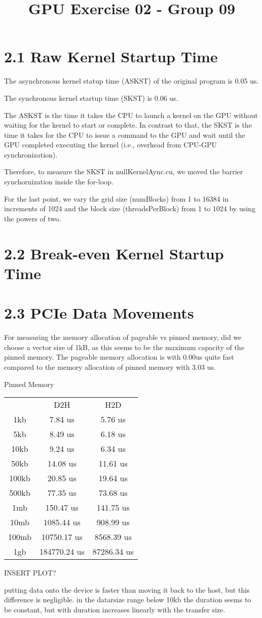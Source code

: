 \documentclass{report}
\begin{document}
\title{GPU Exercise 02 - Group 09}
\maketitle


\section*{2.1 Raw Kernel Startup Time}

The asynchronous kernel statup time (ASKST) of the original program is 0.05 us.

The synchronous kernel startup time (SKST) is 0.06 us.

The ASKST is the time it takes the CPU to launch a kernel on the GPU without waiting for the
kernel to start or complete. In contrast to that, the SKST is the time it takes for the CPU to issue a command to the GPU and wait until the GPU
completed executing the kernel (i.e., overhead from CPU-GPU synchronization).

Therefore, to measure the SKST in nullKernelAync.cu, we moved the barrier synchornization inside the for-loop.

For the last point, we vary the grid size (numBlocks) from 1 to 16384 in increments of 1024 and the block size (threadsPerBlock) from 1 to 1024 by using the powers of two.


\section*{2.2 Break-even Kernel Startup Time}


\section*{2.3 PCIe Data Movements}
For measuring the memory allocation of pageable vs pinned memory, did we choose a vector size of 1kB, as this seems to be the maximum capacity of the pinned memory.
The pageable memory allocation is with 0.00us quite fast compared to the memory allocation of pinned memory with 3.03 us.



Pinned Memory
\begin{center}
    \begin{tabular}{ c c c }
        & D2H & H2D \\ 
     1kb & 7.84 us & 5.76 us \\ 
     5kb & 8.49 us & 6.18 us \\  
     10kb &  9.24  us & 6.34 us \\ 
     50kb & 14.08 us & 11.61 us \\  
     100kb &  20.85   us & 19.64 us \\ 
     500kb & 77.35  us &  73.68 us \\    
     1mb &150.47 us & 141.75 us \\ 
     10mb & 1085.44 us &  908.99 us \\ 
     100mb &  10750.17   us & 8568.39 us \\ 
     1gb & 184770.24 us &  87286.34 us \\ 
    \end{tabular}
    \end{center}

    INSERT PLOT?

    putting data onto the device is faster than moving it back to the host, but this difference is negligible. 
    in the datarsize range below 10kb the duration seems to be constant, but with duration increases linearly with the transfer size.
\end{document}
